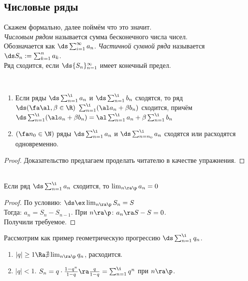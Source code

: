 \subsection{Числовые ряды}
\begin{definition}
	Скажем формально, далее поймём что это значит.\\
	\textit{Числовым рядом} называется сумма бесконечного числа чисел.\\ Обозначается как $\ds\sum_{i=1}^\infty a_n$. \textit{Частичной суммой ряда} называется $\ds S_n:=\sum_{k=1}^na_k$.\\
	Ряд сходится, если $\ds\{S_n\}_{n=1}^\infty$ имеет конечный предел.
\end{definition}
\begin{lemma}\\
	\begin{enumerate}
		\item Если ряды $\ds\sum_{n=1}^\i a_n$ и $\ds\sum_{n=1}^\i b_n$ сходятся, то ряд $\ds(\fa\al,\beta\in\R)\ \sum_{n=1}^\i(\al a_n+\beta b_n)$ сходится, причём $\ds\sum_{n=1}^\i(\al a_n+\beta b_n)=\al\sum_{n=1}^\i a_n+\beta\sum_{n=1}^\i b_n$
		\item $(\fa n_0\in\N)$ ряды $\ds\sum_{n=1}^\i a_n$ и $\ds\sum_{n=n_0}^\i a_n$ сходятся или расходятся одновременно.
	\end{enumerate}
\end{lemma}
\begin{proof}
	Доказательство предлагаем проделать читателю в качестве упражнения.
\end{proof}
\begin{theorem}\label{12_th1}\\
	Если ряд $\ds\sum_{n=1}^\i a_n$ сходится, то $\lim_{n\ra\p}a_n=0$
\end{theorem}
\begin{proof}
	По условию: $\ds\ex\lim_{n\ra\p}S_n=S$\\
	Тогда: $a_n=S_n-S_{n-1}$. При $n\ra\p$: $a_n\ra S-S=0$.\\
	Получили требуемое.
\end{proof}
\begin{example}
	Рассмотрим как пример геометрическую прогрессию $\ds\sum_{n=1}^\i q_n$.
	\begin{enumerate}
		\item $|q|\ge1\Ra\nexists\lim_{n\ra\p}q_n$, расходится.
		\item $|q|<1$. $S_n=q\cdot\frac{1-q^n}{1-q}\ra\frac q{1-q}=\sum_{n=1}^\i q^n$ при $n\ra\p$.
	\end{enumerate}
\end{example}
